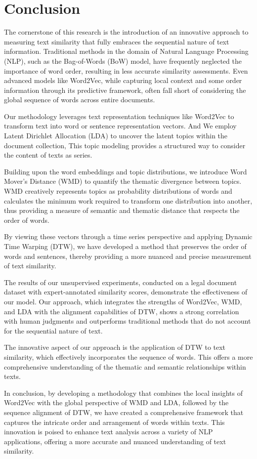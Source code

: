 \documentclass[UTF8]{ctexart}
\begin{document}
\section{Conclusion}
{
    The cornerstone of this research is the introduction of an innovative approach to measuring text similarity that fully 
    embraces the sequential nature of text information. Traditional methods in the domain of Natural Language Processing (NLP), 
    such as the Bag-of-Words (BoW) model, have frequently neglected the importance of word order, 
    resulting in less accurate similarity assessments. Even advanced models like Word2Vec, 
    while capturing local context and some order information through its predictive framework, 
    often fall short of considering the global sequence of words across entire documents.

    Our methodology leverages text representation techniques like Word2Vec 
    to transform text into word or sentence representation vectors. 
    And We employ Latent Dirichlet Allocation (LDA) to uncover the latent topics within the document collection,
    This topic modeling provides a structured way to consider the content of texts as series.

    Building upon the word embeddings and topic distributions, 
    we introduce Word Mover's Distance (WMD) to quantify the thematic divergence between topics.       
    WMD creatively represents topics as probability distributions of words and calculates the minimum 
    work required to transform one distribution into another, 
    thus providing a measure of semantic and thematic distance that respects the order of words.

    By viewing these vectors through a time series perspective and applying Dynamic Time Warping (DTW), 
    we have developed a method that preserves the order of words and sentences, 
    thereby providing a more nuanced and precise measurement of text similarity.

    The results of our unsupervised experiments, conducted on a legal document dataset with expert-annotated similarity scores, 
    demonstrate the effectiveness of our model. Our approach, which integrates the strengths of 
    Word2Vec, WMD, and LDA with the alignment capabilities of DTW, 
    shows a strong correlation with human judgments and outperforms traditional methods that do not account for the sequential nature of text.

    The innovative aspect of our approach is the application of DTW to text similarity, 
    which effectively incorporates the sequence of words. 
    This offers a more comprehensive understanding of the thematic and semantic relationships within texts.

    In conclusion, by developing a methodology that combines the local insights of Word2Vec with the global perspective of WMD and LDA, 
    followed by the sequence alignment of DTW, we have created a comprehensive framework that 
    captures the intricate order and arrangement of words within texts. 
    This innovation is poised to enhance text analysis across a variety of NLP applications, 
    offering a more accurate and nuanced understanding of text similarity.
}
\newpage
\end{document}
